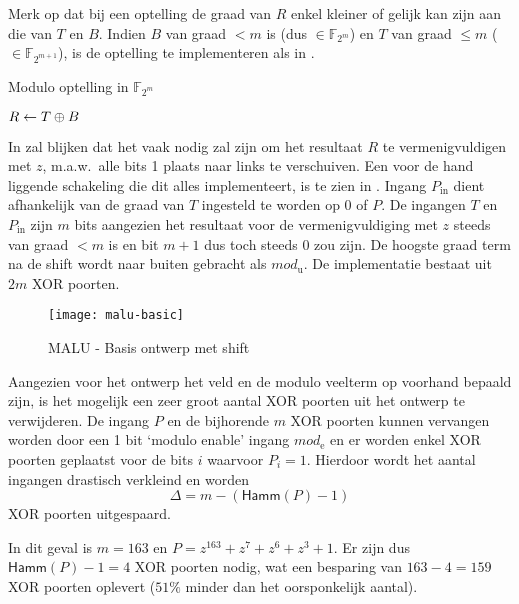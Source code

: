 Merk op dat bij een optelling de graad van $R$ enkel kleiner of gelijk kan zijn aan die van $T$ en $B$. Indien $B$ van graad $< m$ is (dus $\in \mathbb{F}_{2^m}$) en $T$ van graad $\leq m$ ($\in \mathbb{F}_{2^{m+1}}$), is de optelling te implementeren als in .

\begin{algorithm}[h]
	\caption{Modulo optelling in $\mathbb{F}_{2^m}$}
	\label{algoritme-implementatie-malu-modulo}

	$R \gets T \oplus B$\;

	
\end{algorithm}

In  zal blijken dat het vaak nodig zal zijn om het resultaat $R$ te vermenigvuldigen met $z$, m.a.w.\ alle bits 1 plaats naar links te verschuiven. Een voor de hand liggende schakeling die dit alles implementeert, is te zien in . Ingang $P_{\text{in}}$ dient afhankelijk van de graad van $T$ ingesteld te worden op $0$ of $P$. De ingangen $T$ en $P_{\text{in}}$ zijn $m$ bits aangezien het resultaat voor de vermenigvuldiging met $z$ steeds van graad $< m$ is en bit $m + 1$ dus toch steeds 0 zou zijn. De hoogste graad term na de shift wordt naar buiten gebracht als $mod_{\text{u}}$. De implementatie bestaat uit $2m$ XOR poorten.

\begin{figure}[h]
	\centering
		\texttt{[image: malu-basic]}
		\caption{MALU - Basis ontwerp met shift\label{figuur-implementatie-malu-basic}}
\end{figure}

Aangezien voor het ontwerp het veld en de modulo veelterm op voorhand bepaald zijn, is het mogelijk een zeer groot aantal XOR poorten uit het ontwerp te verwijderen. De ingang $P$ en de bijhorende $m$ XOR poorten kunnen vervangen worden door een 1 bit `modulo enable' ingang $mod_{\text{e}}$ en er worden enkel XOR poorten geplaatst voor de bits $i$ waarvoor $P_i = 1$. Hierdoor wordt het aantal ingangen drastisch verkleind en worden 
\[\Delta = m - (\textsf{Hamm}(P) - 1)\]
XOR poorten uitgespaard.

In dit geval is $m = 163$ en $P = z^{163} + z^7 + z^6 + z^3 + 1$. Er zijn dus $\textsf{Hamm}(P) - 1 = 4$ XOR poorten nodig, wat een besparing van $163 - 4 =  159$ XOR poorten oplevert ($51\%$ minder dan het oorsponkelijk aantal).

